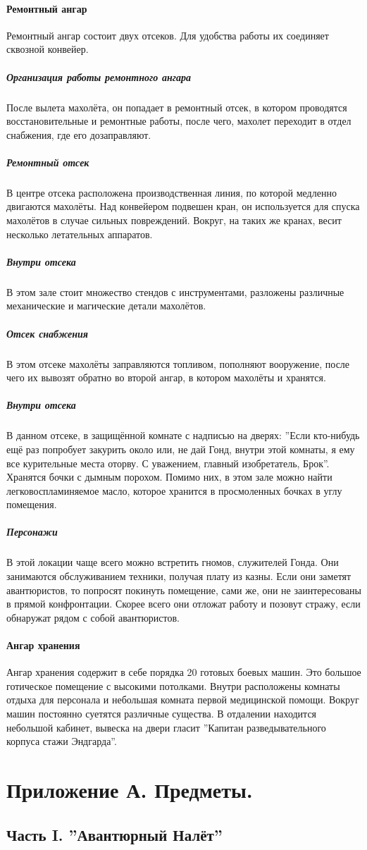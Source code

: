 \documentclass[a4paper,12pt,twoside,twocolumn]{book}
\begin{document}
\paragraph{Ремонтный ангар}
Ремонтный ангар состоит двух отсеков. Для удобства работы их соединяет сквозной конвейер.
\subparagraph{Организация работы ремонтного ангара}
После вылета махолёта, он попадает в ремонтный отсек, в котором проводятся восстановительные и ремонтные работы, после чего, махолет переходит в отдел снабжения, где его 
дозаправляют.
\subparagraph{Ремонтный отсек}
В центре отсека расположена производственная линия, по которой медленно двигаются махолёты. Над конвейером подвешен кран, он используется для спуска махолётов в случае 
сильных повреждений. Вокруг, на таких же кранах, весит несколько летательных аппаратов.
\subparagraph{Внутри отсека}
В этом зале стоит множество стендов с инструментами, разложены различные механические и магические детали махолётов.
\subparagraph{Отсек снабжения}
В этом отсеке махолёты заправляются топливом, пополняют вооружение, после чего их вывозят обратно во второй ангар, в котором махолёты и хранятся.
\subparagraph{Внутри отсека}
В данном отсеке, в защищённой комнате с надписью на дверях: ''Если кто-нибудь ещё раз попробует закурить около или, не дай Гонд, внутри этой комнаты, я ему все курительные 
места оторву. С уважением, главный изобретатель, Брок''. Хранятся бочки с дымным порохом. Помимо них, в этом зале можно найти легковоспламиняемое масло, которое хранится в 
просмоленных бочках в углу помещения.
\subparagraph{Персонажи}
В этой локации чаще всего можно встретить гномов, служителей Гонда. Они занимаются обслуживанием техники, получая плату из казны. Если они заметят авантюристов, то попросят 
покинуть помещение, сами же, они не заинтересованы в прямой конфронтации. Скорее всего они отложат работу и позовут стражу, если обнаружат рядом с собой авантюристов.
\paragraph{Ангар хранения}
Ангар хранения содержит в себе порядка 20 готовых боевых машин. Это большое готическое помещение с высокими потолками. Внутри расположены комнаты отдыха для персонала и 
небольшая комната первой медицинской помощи. Вокруг машин постоянно суетятся различные существа. В отдалении находится небольшой кабинет, вывеска на двери гласит ''Капитан 
разведывательного корпуса стажи Эндгарда''.
\section{Приложение А. Предметы.}
\subsection{Часть I. ''Авантюрный Налёт''}
\end{document}
